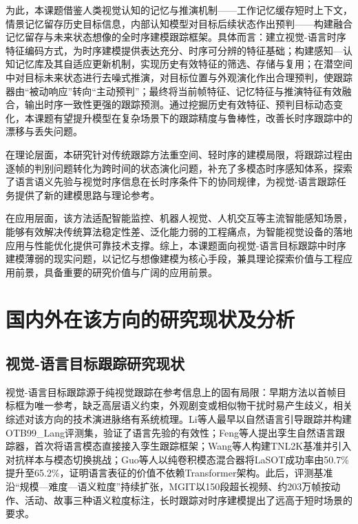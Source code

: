 为此，本课题借鉴人类视觉认知的记忆与推演机制——工作记忆缓存短时上下文，情景记忆留存历史目标信息，内部认知模型对目标后续状态作出预判——构建融合记忆留存与未来状态想像的全时序建模跟踪框架。具体而言：建立视觉-语言时序特征编码方式，为时序建模提供表达充分、时序可分辨的特征基础；构建感知—认知记忆库及其自适应更新机制，实现历史有效特征的筛选、存储与复用；在潜空间中对目标未来状态进行去噪式推演，对目标位置与外观演化作出合理预判，使跟踪器由“被动响应”转向“主动预判”；最终将当前帧特征、记忆特征与推演特征有效融合，输出时序一致性更强的跟踪预测。通过挖掘历史有效特征、预判目标动态变化，本课题有望提升模型在复杂场景下的跟踪精度与鲁棒性，改善长时序跟踪中的漂移与丢失问题。

在理论层面，本研究针对传统跟踪方法重空间、轻时序的建模局限，将跟踪过程由逐帧的判别问题转化为跨时间的状态演化问题，补充了多模态时序感知体系，探索了语言语义先验与视觉时序信息在长时序条件下的协同规律，为视觉-语言跟踪任务提供了新的建模思路与理论参考。

在应用层面，该方法适配智能监控、机器人视觉、人机交互等主流智能感知场景，能够有效解决传统算法稳定性差、泛化能力弱的工程痛点，为智能视觉设备的落地应用与性能优化提供可靠技术支撑。综上，本课题面向视觉-语言目标跟踪中时序建模薄弱的现实问题，以记忆与想像建模为核心手段，兼具理论探索价值与工程应用前景，具备重要的研究价值与广阔的应用前景。

\section{国内外在该方向的研究现状及分析}

\subsection{视觉-语言目标跟踪研究现状}

视觉-语言目标跟踪源于纯视觉跟踪在参考信息上的固有局限：早期方法以首帧目标框为唯一参考，缺乏高层语义约束，外观剧变或相似物干扰时易产生歧义，相关综述对该方向的技术演进脉络有系统梳理\cite{ma2024review}。Li等人\cite{li2017tracking}最早以自然语言引导跟踪并构建OTB99\_Lang评测集，验证了语言先验的有效性；Feng等人\cite{feng2021siamnlt}提出孪生自然语言跟踪器，首次将语言模态直接接入孪生跟踪框架；Wang等人\cite{wang2021tnl2k}构建TNL2K基准并引入对抗样本与模态切换挑战；Guo等人\cite{guo2024divert}以纯卷积模态混合器将LaSOT成功率由50.7\%提升至65.2\%，证明语言表征的价值不依赖Transformer架构。此后，评测基准沿“规模—难度—语义粒度”持续扩张，MGIT\cite{hu2023mgit}以150段超长视频、约203万帧按动作、活动、故事三种语义粒度标注，长时跟踪对时序建模提出了远高于短时场景的要求。

